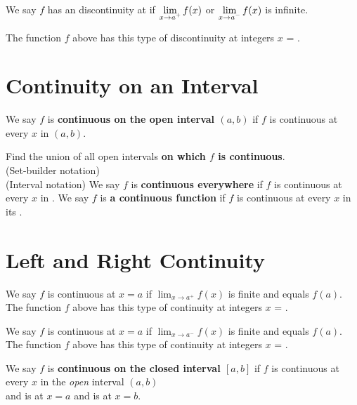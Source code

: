 \documentclass[10pt, answers]{exam}
\begin{document}
\begin{questions}
\question We say $f$ has an
   discontinuity
  at \fillin[$x=a$][0.5in]
  if $\lim\limits_{x\to a\smash{^+}}f(x)$
  or $\lim\limits_{x\to a\smash{^-}}f(x)$
  is infinite.
  \par
  The function $f$ above has this type of discontinuity at integers $x$ = \fillin[][2in].

\vspace{-1mm}
\section{Continuity on an Interval}
\vspace{-2mm}
\question We say $f$ is 
  \textbf{continuous on the open interval
  \boldmath $(a,b)$}
  if $f$ is continuous at every $x$ 
  in $(a,b)$.
  \par Find the union of all open intervals
  \textbf{on which $f$
  is continuous}.
  \\[3ex] (Set-builder notation) \fillin[][5in]
  \\[3ex] (Interval notation) \fillin[][5in]
\question We say $f$ is \textbf{continuous everywhere}
  if $f$ is continuous at every $x$ in \fillin[][1in].
\question We say $f$ is 
  \textbf{a continuous function} 
  if $f$ is continuous at every 
  $x$ in its \fillin[][1in].

\vspace{-1mm}
\section{Left and Right Continuity}
\vspace{-4mm}
\question We say $f$ is \fillin[left][1in] 
  continuous at $x=a$
  if $\lim_{x\to a^+}f(x)$ is finite 
  and equals $f(a)$.
  \\[2ex]
  The function $f$ above
  has this type of continuity at integers
  $x$ = \fillin[][2in].

\question We say $f$ is \fillin[right][1in] 
  continuous at $x=a$
  if $\lim_{x\to a^-}f(x)$ is finite 
  and equals $f(a)$.
  \\[2ex]
  The function $f$ above
  has this type of continuity at integers
  $x$ = \fillin[][2in].

\question We say $f$ is \textbf{continuous on the closed interval \boldmath $[a,b]$}
  if $f$ is continuous at every $x$ in the \emph{open} interval $(a,b)$
  \\[2ex]
  and is  at $x=a$
  and is  at $x=b$.
%
\end{questions}
\end{document}
